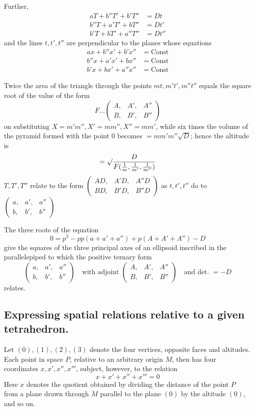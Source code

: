 Further,
\[
\begin{aligned}
aT+b''T'+b'T''&=Dt\\
b''T+a'T'+bT''&=Dt'\\
b'T+bT'+a''T''&=Dt''
\end{aligned}
\]
and the lines $t,t',t''$ are perpendicular to the planes whose equations
\[
\begin{aligned}
ax+b''x'+b'x''&=\mathrm{Const}\\
b''x+a'x'+bx''&=\mathrm{Const}\\
b'x+bx'+a''x''&=\mathrm{Const}
\end{aligned}
\]

Twice the area of the triangle through the points $mt,m't',m''t''$ equals the square root of the value of the form
\[
F\ldots\left(\begin{smallmatrix}A,&A',&A''\\B,&B',&B''\end{smallmatrix}\right)
\]
on substituting $X=m'm'',X'=mm'',X''=mm'$, while six times the volume of the pyramid formed with the point $0$ becomes $=mm'm''\surd D$; hence the altitude is
\[
=\surd\frac{D}{F(\frac1m,\frac1{m'},\frac1{m''})}
\]
$T,T',T''$ relate to the form $\left(\begin{smallmatrix}AD,&A'D,&A''D\\BD,&B'D,&B''D\end{smallmatrix}\right)$ as $t,t',t''$ do to $\left(\begin{smallmatrix}a,&a',&a''\\b,&b',&b''\end{smallmatrix}\right)$

The three roots of the equation
\[
0=p^3-pp(a+a'+a'')+p(A+A'+A'')-D
\]
give the squares of the three principal axes of an ellipsoid inscribed in the parallelepiped to which the positive ternary form
\[
\left(\begin{smallmatrix}a,&a',&a''\\b,&b',&b''\end{smallmatrix}\right)
\quad\text{with adjoint }\left(\begin{smallmatrix}A,&A',&A''\\B,&B',&B''\end{smallmatrix}\right)
\quad\text{and det. }=-D
\]
relates.

\subsection*{Expressing spatial relations relative to a given tetrahedron.}
Let $(0),(1),(2),(3)$ denote the four vertices, opposite faces and altitudes. Each point in space $P$, relative to an arbitrary origin $M$, then has four coordinates $x,x',x'',x'''$, subject, however, to the relation
\[
x+x'+x''+x'''=0
\]
Here $x$ denotes the quotient obtained by dividing the distance of the
point $P$ from a plane drawn through $M$ parallel to the plane $(0)$ by the altitude $(0)$, and so on.

